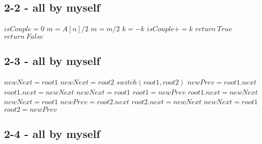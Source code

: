 \documentclass[12pt]{article}
\begin{document}
\subsection*{2-2 - all by myself}
\begin{algorithmic}
    \State $isCouple = 0$
    \State $m = A[n]/2$
    \State $m=m/2$
    \State $k = -k$
    \EndIf
    \State $isCouple += k$
    \EndFor
    \State $return\ True$
    \Else
    \State $return\ False$
    \EndIf
    \EndProcedure
\end{algorithmic}\newpage

\subsection*{2-3 - all by myself}
\begin{algorithmic}
    \State $newNext = root1$
    \Else
    \State $newNext = root2$
    \EndIf
    \State $switch(root1, root2)$
    \EndIf
    \State $newPrev = root1.next$
    \State $root1.next = newNext$
    \State $newNext = root1$
    \State $root1 = newPrev$
    \Else
    \State $root1.next = newNext$
    \State $newNext = root1$
    \State $newPrev = root2.next$
    \State $root2.next = newNext$
    \State $newNext = root1$
    \State $root2 = newPrev$
    \EndWhile
    \EndIf
    \EndWhile
    \EndProcedure
\end{algorithmic}

\subsection*{2-4 - all by myself}
\begin{algorithmic}
    \State $$
    \EndWhile
    \EndProcedure
\end{algorithmic}
\end{document}
